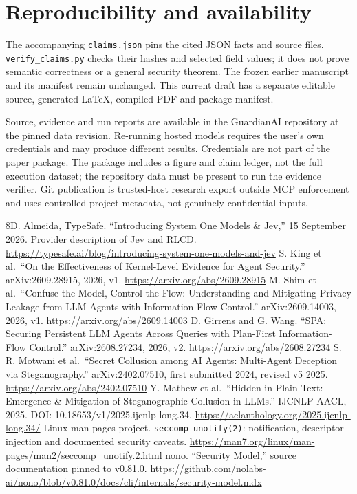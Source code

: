 \documentclass[conference]{IEEEtran}
\begin{document}
\section{Reproducibility and availability}\label{reproducibility-and-availability}

The accompanying \texttt{claims.json} pins the cited JSON facts and source files. \texttt{verify\_claims.py} checks their hashes and selected field values; it does not prove semantic correctness or a general security theorem. The frozen earlier manuscript and its manifest remain unchanged. This current draft has a separate editable source, generated LaTeX, compiled PDF and package manifest.

Source, evidence and run reports are available in the GuardianAI repository at the pinned data revision. Re-running hosted models requires the user's own credentials and may produce different results. Credentials are not part of the paper package. The package includes a figure and claim ledger, not the full execution dataset; the repository data must be present to run the evidence verifier. Git publication is trusted-host research export outside MCP enforcement and uses controlled project metadata, not genuinely confidential inputs.
\begin{thebibliography}{8}D. Almeida, TypeSafe. ``Introducing System One Models \& Jev,'' 15 September 2026. Provider description of Jev and RLCD. \url{https://typesafe.ai/blog/introducing-system-one-models-and-jev}
S. King et al.~``On the Effectiveness of Kernel-Level Evidence for Agent Security.'' arXiv:2609.28915, 2026, v1. \url{https://arxiv.org/abs/2609.28915}
M. Shim et al.~``Confuse the Model, Control the Flow: Understanding and Mitigating Privacy Leakage from LLM Agents with Information Flow Control.'' arXiv:2609.14003, 2026, v1. \url{https://arxiv.org/abs/2609.14003}
D. Girrens and G. Wang. ``SPA: Securing Persistent LLM Agents Across Queries with Plan-First Information-Flow Control.'' arXiv:2608.27234, 2026, v2. \url{https://arxiv.org/abs/2608.27234}
S. R. Motwani et al.~``Secret Collusion among AI Agents: Multi-Agent Deception via Steganography.'' arXiv:2402.07510, first submitted 2024, revised v5 2025. \url{https://arxiv.org/abs/2402.07510}
Y. Mathew et al.~``Hidden in Plain Text: Emergence \& Mitigation of Steganographic Collusion in LLMs.'' IJCNLP-AACL, 2025. DOI: 10.18653/v1/2025.ijcnlp-long.34. \url{https://aclanthology.org/2025.ijcnlp-long.34/}
Linux man-pages project. \texttt{seccomp\_unotify(2)}: notification, descriptor injection and documented security caveats. \url{https://man7.org/linux/man-pages/man2/seccomp_unotify.2.html}
nono. ``Security Model,'' source documentation pinned to v0.81.0. \url{https://github.com/nolabs-ai/nono/blob/v0.81.0/docs/cli/internals/security-model.mdx}\end{thebibliography}
\end{document}
